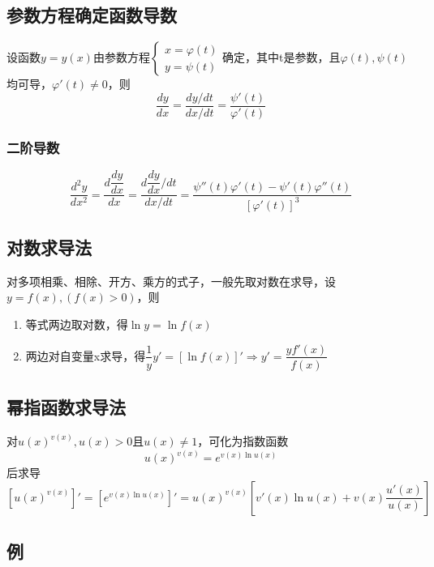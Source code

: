 \subsection{参数方程确定函数导数}

设函数\(y = y(x)\)由参数方程\(\begin{cases}
x = \varphi(t) \\ 
y = \psi(t)
\end{cases}\)确定，其中t是参数，且\(\varphi(t), \psi(t)\)均可导，\(\varphi'(t) \neq 0\)，则\[\dfrac{dy}{dx} = \dfrac{dy/dt}{dx/dt} = \dfrac{\psi'(t)}{\varphi'(t)}\]

\subsubsection{二阶导数}

\[\dfrac{d^2y}{dx^2} = \dfrac{d\dfrac{dy}{dx}}{dx} = \dfrac{d\dfrac{dy}{dx} / dt}{dx / dt} = \dfrac{\psi''(t)\varphi'(t) - \psi'(t)\varphi''(t)}{[\varphi'(t)]^3}\]

\subsection{对数求导法}

对多项相乘、相除、开方、乘方的式子，一般先取对数在求导，设\(y = f(x), (f(x) > 0)\)，则\begin{enumerate}
    \item 等式两边取对数，得\(\ln y = \ln f(x)\)
    \item 两边对自变量x求导，得\(\dfrac{1}{y}y' = [\ln f(x)]' \Rightarrow y' = \dfrac{yf'(x)}{f(x)}\)
\end{enumerate}


\subsection{幂指函数求导法}

对\(u(x)^{v(x)}, u(x) > 0\)且\(u(x) \neq 1\)，可化为指数函数\[u(x)^{v(x)} = e^{v(x)\ln u(x)}\]后求导\[[u(x)^{v(x)}]' = [e^{v(x)\ln u(x)}]' = u(x)^{v(x)}[v'(x)\ln u(x) + v(x)\dfrac{u'(x)}{u(x)}]\]




\subsection{例}

